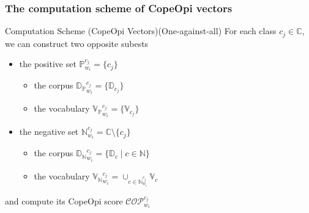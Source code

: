 \documentclass[mathserif]{beamer}
\DeclareMathOperator*{\where}{|}
\begin{document}
\begin{frame}
\frametitle{The computation scheme of CopeOpi vectors}
\begin{block}{Computation Scheme (CopeOpi Vectors)(One-against-all)}
For each class $c_j \in \mathbb{C}$, we can construct two opposite subests
\begin{itemize}
\item the positive set $\mathbb{P}^{c_j}_{w_i} = \{c_j\}$
	\begin{itemize}
		\item the corpus ${\mathbb{D}_\mathbb{P}}^{c_j}_{w_i} = \{\mathbb{D}_{c_j}\}$
		\item the vocabulary ${\mathbb{V}_\mathbb{P}}^{c_j}_{w_i} = \{\mathbb{V}_{c_j}\}$
	\end{itemize}
\item the negative set $\mathbb{N}^{c_j}_{w_i} = \mathbb{C} \setminus \{c_j\}$
	\begin{itemize}
	\item the corpus ${\mathbb{D}_\mathbb{N}}^{c_j}_{w_i} = \{\mathbb{D}_{c} \where c \in \mathbb{N}\}$
	\item the vocabulary ${\mathbb{V}_\mathbb{N}}^{c_j}_{w_i} = \cup_{c \in \mathbb{N}^{c_j}_{w_i}} \mathbb{V}_{c}$
	\end{itemize}
\end{itemize}
and compute its CopeOpi score $\mathcal{COP}^{c_j}_{w_i}$
\end{block}
\end{frame}
\end{document}
